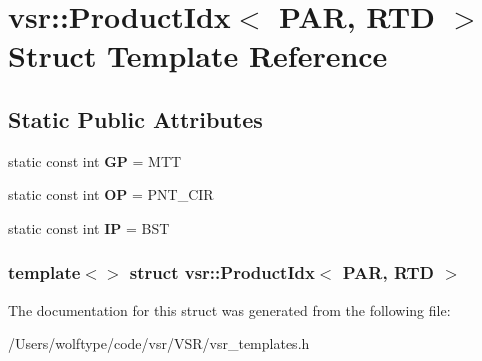 \hypertarget{structvsr_1_1_product_idx_3_01_p_a_r_00_01_r_t_d_01_4}{\section{vsr\-:\-:Product\-Idx$<$ P\-A\-R, R\-T\-D $>$ Struct Template Reference}
\label{structvsr_1_1_product_idx_3_01_p_a_r_00_01_r_t_d_01_4}
}
\subsection*{Static Public Attributes}
\begin{DoxyCompactItemize}
\item 
\hypertarget{structvsr_1_1_product_idx_3_01_p_a_r_00_01_r_t_d_01_4_ac9785eef6d58f0f06b209325657b19d9}{static const int {\bfseries G\-P} = M\-T\-T}\label{structvsr_1_1_product_idx_3_01_p_a_r_00_01_r_t_d_01_4_ac9785eef6d58f0f06b209325657b19d9}

\item 
\hypertarget{structvsr_1_1_product_idx_3_01_p_a_r_00_01_r_t_d_01_4_a91663c0008e86d6baef1d40c2578e990}{static const int {\bfseries O\-P} = P\-N\-T\-\_\-\-C\-I\-R}\label{structvsr_1_1_product_idx_3_01_p_a_r_00_01_r_t_d_01_4_a91663c0008e86d6baef1d40c2578e990}

\item 
\hypertarget{structvsr_1_1_product_idx_3_01_p_a_r_00_01_r_t_d_01_4_abf4ad82b8b7460efba3ca645afda18f3}{static const int {\bfseries I\-P} = B\-S\-T}\label{structvsr_1_1_product_idx_3_01_p_a_r_00_01_r_t_d_01_4_abf4ad82b8b7460efba3ca645afda18f3}

\end{DoxyCompactItemize}
\subsubsection*{template$<$$>$ struct vsr\-::\-Product\-Idx$<$ P\-A\-R, R\-T\-D $>$}



The documentation for this struct was generated from the following file\-:\begin{DoxyCompactItemize}
\item 
/\-Users/wolftype/code/vsr/\-V\-S\-R/vsr\-\_\-templates.\-h\end{DoxyCompactItemize}
